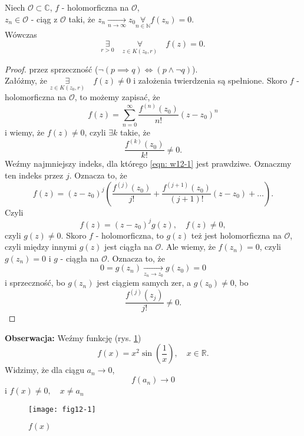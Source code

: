 \documentclass[../main.tex]{subfiles}
\begin{document}
\begin{tw}
    Niech $\mathcal{O}\subset\mathbb{C}$, $f$ - holomorficzna na $\mathcal{O}$,\\
    $z_n\in\mathcal{O}$ - ciąg z $\mathcal{O}$ taki, że $z_n \underset{n\to \infty}{\longrightarrow}z_0 \underset{n\in \mathbb{N}}{\forall} f(z_n) = 0$.\\
    Wówczas
    \[
        \underset{r > 0}{\exists}\quad \underset{z\in K(z_0, r)}{\forall} \quad f(z) = 0
    .\]
\end{tw}
\begin{proof}
    przez sprzeczność ($\lnot(p\implies q) \iff (p \land \lnot q)$).\\
    Załóżmy, że $\underset{z\in K(z_0, r)}{\exists}\quad f(z) \neq 0$ i założenia twierdzenia są spełnione. Skoro $f$ - holomorficzna na $\mathcal{O}$, to możemy zapisać, że
    \[
        f(z) = \sum_{n = 0}^\infty \frac{f^{(n)}(z_0)}{n!} (z-z_0)^n
    \]
    i wiemy, że $f(z) \neq 0$, czyli $\exists k$ takie, że
    \begin{equation}
        \label{eqn: w12-1}
        \frac{f^{(k)}(z_0)}{k!} \neq 0 \tag{$\star$}
    .\end{equation}
    Weźmy najmniejszy indeks, dla którego \eqref{eqn: w12-1} jest prawdziwe. Oznaczmy ten indeks przez $j$. Oznacza to, że
    \[
        f(z) = (z - z_0)^j\left( \frac{f^{(j)}(z_0)}{j!} + \frac{f^{(j+1)}(z_0)}{(j+1)!} (z-z_0) + \dots\right)
    .\]
Czyli
    \[
        f(z) = (z-z_0)^j g(z),\quad f(z) \neq 0
    ,\]
czyli $g(z) \neq 0$. Skoro $f$ - holomorficzna, to $g(z)$ też jest holomorficzna na $\mathcal{O}$, czyli między innymi $g(z)$ jest ciągła na $\mathcal{O}$. Ale wiemy, że $f(z_n) = 0$, czyli $g(z_n) = 0$ i $g$ - ciągła na $\mathcal{O}$. Oznacza to, że
    \[
        0 = g(z_n) \underset{z_n\to z_0}{\longrightarrow} g(z_0) = 0
    \]
    i sprzeczność, bo $g(z_n)$ jest ciągiem samych zer, a $g(z_0) \neq 0$, bo
    \[
        \frac{f^{(j)}(z_j)}{j!} \neq 0
    .\]
\end{proof}
\textbf{Obserwacja: } Weźmy funkcję (rys. \ref{fig:fig12-1})
\[
    f(x) = x^2 \sin\left(\frac{1}{x}\right),\quad x\in \mathbb{R}
.\]
Widzimy, że dla ciągu $a_n \to 0$,
\[
    f(a_n) \longrightarrow 0
\]
i $f(x) \neq 0,\quad x\neq a_n$
\begin{figure}[h]
    \center
    \texttt{[image: fig12-1]}
    \caption{$f(x)$}
    \label{fig:fig12-1}
\end{figure}
\end{document}
